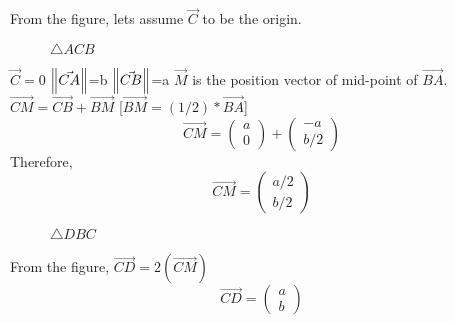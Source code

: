 
From the figure, lets assume $\vec{C}$ to be the origin.
\newline
\begin{figure}[H]

\caption{$\triangle ACB$}
\end{figure}
$\vec{C}=0$
\newline
$\left\lVert\vec{CA}\right\rVert$=b
\newline
$\left\lVert\vec{CB}\right\rVert$=a
\newline
$\vec{M}$ is the position vector of mid-point of $\vec{BA}$.
\newline
$\vec{CM} = \vec{CB}+\vec{BM}$ [$\vec{BM}=(1/2)*\vec{BA}$]
\newline
$$\vec{CM} =\begin{pmatrix}a\\0\end{pmatrix}+\begin{pmatrix}-a\\b/2\end{pmatrix}$$
\newline
Therefore, $$\vec{CM}=\begin{pmatrix}a/2\\b/2\end{pmatrix}$$
\newline
\begin{figure}[H]

\caption{$\triangle DBC$}
\end{figure}
From the figure, $\vec{CD}=2(\vec{CM})$
\newline
$$\vec{CD}=\begin{pmatrix}a\\b\end{pmatrix}$$
